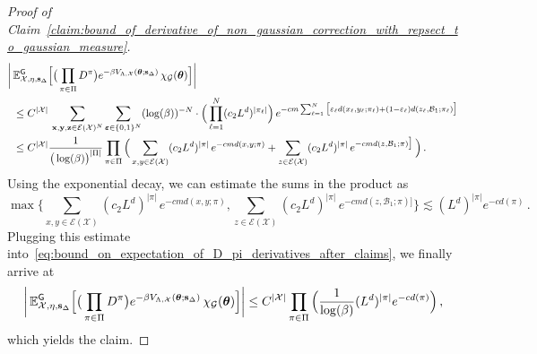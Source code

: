 \documentclass[11pt]{article}
\theoremstyle{definition}
\theoremstyle{remark}
\numberwithin{theorem}{section}
\def\eps{{\varepsilon}}
\def\La{{\Lambda}}
\newcommand{\bE}{\mathbb E}
\newcommand{\cE}{\mathcal{E}}
\begin{document}
\begin{proof}[Proof of Claim~\ref{claim:bound_of_derivative_of_non_gaussian_correction_with_repsect_to_gaussian_measure}]
        \begin{align} \label{eq:bound_on_expectation_of_D_pi_derivatives_after_claims} \nonumber
            \bigg| \, & \bE_{\mathcal{X},\eta,\mathbf{s}_{\Delta}}^{\sf G} \Big[ \big( \prod_{\pi\in \Pi} D^\pi\big)  e^{-\beta V_{\La,\mathcal{X}} (\boldsymbol{\theta}; \mathbf{s}_{\Delta})}  \, \chi_{\mathcal{G}} (\boldsymbol{\theta})   \Big] \bigg| \\ \nonumber & \le C^{|\mathcal{X}|} \,  \sum_{\mathbf{x},\mathbf{y},\mathbf{z} \in \cE(\mathcal{X})^N} \sum_{\boldsymbol{\eps} \in \{0,1\}^N} (\log(\beta))^{-N} \cdot \Big(\prod_{\ell=1}^{N} (c_2 L^d)^{|\pi_\ell|}\Big) \, e^{- c m \sum_{\ell=1}^{N} \big[\eps_\ell d(x_\ell,y_\ell;\pi_\ell) + (1-\eps_\ell) d(z_\ell, \mathcal{B}_1 ; \pi_\ell)\big] }  \\ &\le  C^{|\mathcal{X}|} \frac{1}{\big(\log (\beta) \big)^{|\Pi|}} \prod_{\pi\in \Pi} \Big(  \sum_{x,y\in \cE(\mathcal{X})} (c_2L^d)^{|\pi|} \, e^{- c m d(x,y;\pi)} + \sum_{z\in \cE(\mathcal{X})} (c_2L^d)^{|\pi|} \, e^{- c m d(z, \mathcal{B}_1 ; \pi)\big] } \, \Big) \, .
        \end{align}
        Using the exponential decay, we can estimate the sums in the product as 
        \[
        \max\bigg\{\sum_{x,y\in \cE(\mathcal{X})} (c_2L^d)^{|\pi|} \, e^{- c m d(x,y;\pi)} , \sum_{z\in \cE(\mathcal{X})} (c_2L^d)^{|\pi|} \, e^{- c m d(z, \mathcal{B}_1 ; \pi)\big] } \bigg\} \lesssim  (L^d)^{|\pi|} e^{-cd(\pi)} \, . 
        \]
        Plugging this estimate into~\eqref{eq:bound_on_expectation_of_D_pi_derivatives_after_claims}, we finally arrive at
        \[
        \bigg| \,  \bE_{\mathcal{X},\eta,\mathbf{s}_{\Delta}}^{\sf G} \Big[ \big( \prod_{\pi\in \Pi} D^\pi\big) e^{-\beta V_{\La,\mathcal{X}} (\boldsymbol{\theta}; \mathbf{s}_{\Delta})}  \, \chi_{\mathcal{G}} (\boldsymbol{\theta})   \Big] \bigg| \le C^{|\mathcal{X}|} \prod_{\pi \in \Pi} \Big( \frac{1}{\log(\beta)} (L^d)^{|\pi|} e^{-cd(\pi)}\Big) \, ,
        \]
        which yields the claim. 
    \end{proof}
\end{document}

